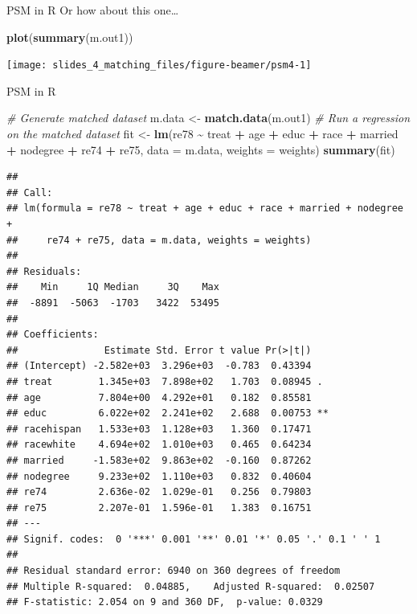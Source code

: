\documentclass[
  ignorenonframetext,
  aspectratio=169, handout]{beamer}
\newenvironment{Shaded}{\begin{snugshade}}{\end{snugshade}}
\newcommand{\AttributeTok}[1]{\textcolor[rgb]{0.13,0.29,0.53}{#1}}
\newcommand{\CommentTok}[1]{\textcolor[rgb]{0.56,0.35,0.01}{\textit{#1}}}
\newcommand{\FunctionTok}[1]{\textcolor[rgb]{0.13,0.29,0.53}{\textbf{#1}}}
\newcommand{\NormalTok}[1]{#1}
\newcommand{\OtherTok}[1]{\textcolor[rgb]{0.56,0.35,0.01}{#1}}
\newcommand{\SpecialCharTok}[1]{\textcolor[rgb]{0.81,0.36,0.00}{\textbf{#1}}}
\begin{document}
\begin{frame}[fragile]{PSM in R}
\protect\hypertarget{psm-in-r-3}{}
Or how about this one\ldots{}

\begin{Shaded}
\begin{Highlighting}[]
\FunctionTok{plot}\NormalTok{(}\FunctionTok{summary}\NormalTok{(m.out1))}
\end{Highlighting}
\end{Shaded}

\texttt{[image: slides\_4\_matching\_files/figure-beamer/psm4-1]}
\end{frame}

\begin{frame}[fragile]{PSM in R}
\protect\hypertarget{psm-in-r-4}{}
\footnotesize

\begin{Shaded}
\begin{Highlighting}[]
\CommentTok{\# Generate matched dataset}
\NormalTok{m.data }\OtherTok{\textless{}{-}} \FunctionTok{match.data}\NormalTok{(m.out1)}
\CommentTok{\# Run a regression on the matched dataset}
\NormalTok{fit }\OtherTok{\textless{}{-}} \FunctionTok{lm}\NormalTok{(re78 }\SpecialCharTok{\textasciitilde{}}\NormalTok{ treat }\SpecialCharTok{+}\NormalTok{ age }\SpecialCharTok{+}\NormalTok{ educ }\SpecialCharTok{+}\NormalTok{ race }\SpecialCharTok{+}\NormalTok{ married }\SpecialCharTok{+}\NormalTok{ nodegree }\SpecialCharTok{+} 
\NormalTok{             re74 }\SpecialCharTok{+}\NormalTok{ re75, }\AttributeTok{data =}\NormalTok{ m.data, }\AttributeTok{weights =}\NormalTok{ weights)}
\FunctionTok{summary}\NormalTok{(fit)}
\end{Highlighting}
\end{Shaded}

\begin{verbatim}
## 
## Call:
## lm(formula = re78 ~ treat + age + educ + race + married + nodegree + 
##     re74 + re75, data = m.data, weights = weights)
## 
## Residuals:
##    Min     1Q Median     3Q    Max 
##  -8891  -5063  -1703   3422  53495 
## 
## Coefficients:
##               Estimate Std. Error t value Pr(>|t|)   
## (Intercept) -2.582e+03  3.296e+03  -0.783  0.43394   
## treat        1.345e+03  7.898e+02   1.703  0.08945 . 
## age          7.804e+00  4.292e+01   0.182  0.85581   
## educ         6.022e+02  2.241e+02   2.688  0.00753 **
## racehispan   1.533e+03  1.128e+03   1.360  0.17471   
## racewhite    4.694e+02  1.010e+03   0.465  0.64234   
## married     -1.583e+02  9.863e+02  -0.160  0.87262   
## nodegree     9.233e+02  1.110e+03   0.832  0.40604   
## re74         2.636e-02  1.029e-01   0.256  0.79803   
## re75         2.207e-01  1.596e-01   1.383  0.16751   
## ---
## Signif. codes:  0 '***' 0.001 '**' 0.01 '*' 0.05 '.' 0.1 ' ' 1
## 
## Residual standard error: 6940 on 360 degrees of freedom
## Multiple R-squared:  0.04885,    Adjusted R-squared:  0.02507 
## F-statistic: 2.054 on 9 and 360 DF,  p-value: 0.0329
\end{verbatim}
\end{frame}
\end{document}
